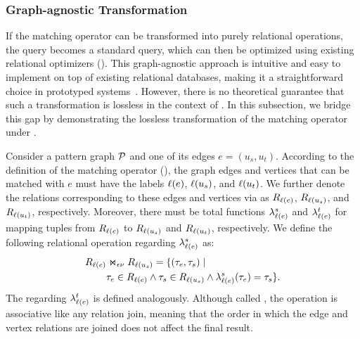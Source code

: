 

\subsubsection{Graph-agnostic Transformation}
\label{sec:intuitive-method}
If the matching operator can be transformed into purely relational operations, the \spjm query becomes a
standard \spj query, which can then be optimized using existing relational optimizers (). This graph-agnostic
approach is intuitive and easy to implement on top of existing relational databases, making it a straightforward
choice in prototyped systems~\cite{apache-age,DuckPGQ,DuckPGQ-VLDB}. However, there is no theoretical guarantee that
such a transformation is lossless in the context of \rgmapping. In this subsection,
we bridge this gap by demonstrating the lossless transformation of the matching
operator under \rgmapping.

Consider a pattern graph $\mathcal{P}$ and one of its edges $e = (u_s, u_t)$. According to the definition of the matching operator (), the graph edges and vertices that can be matched with $e$ must have the labels $\mathcal{\ell}(e)$, $\mathcal{\ell}(u_s)$, and $\mathcal{\ell}(u_t)$. We further denote the relations corresponding to these edges and vertices via \rgmapping as $R_{\mathcal{\ell}(e)}$, $R_{\mathcal{\ell}(u_s)}$, and $R_{\mathcal{\ell}(u_t)}$, respectively. Moreover, there must be total functions $\lambda_{\mathcal{\ell}(e)}^s$ and $\lambda_{\mathcal{\ell}(e)}^t$ for mapping tuples from $R_{\mathcal{\ell}(e)}$ to $R_{\mathcal{\ell}(u_s)}$ and $R_{\mathcal{\ell}(u_t)}$, respectively. We define the following \EVjoin relational operation regarding $\lambda_{\mathcal{\ell}(e)}^s$ as:
\begin{equation} \label{eq:ev-join}
\begin{split}
R_{\mathcal{\ell}(e)} & \Join_{\epsilon\nu} R_{\mathcal{\ell}(u_s)} = \{(\tau_e, \tau_s) \;|\; \\
  &  \tau_e \in R_{\mathcal{\ell}(e)} \land \tau_s \in R_{\mathcal{\ell}(u_s)} \land \lambda_{\mathcal{\ell}(e)}^s(\tau_e) = \tau_s\}.
\end{split}
\end{equation}
The \EVjoin regarding $\lambda_{\mathcal{\ell}(e)}^t$ is defined analogously. Although called \EVjoin, the operation is associative like any relation join, meaning that the order in which the edge and vertex relations are joined does not affect the final result.


